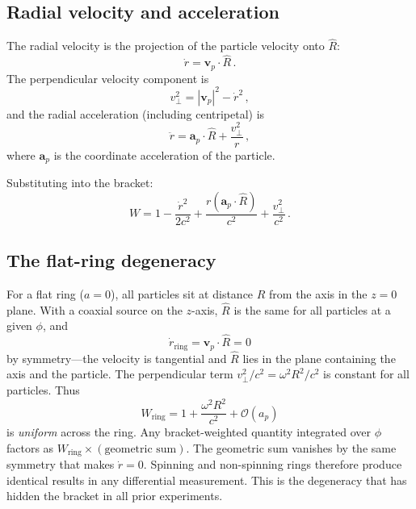 \documentclass[12pt,preprint,amsmath,amssymb]{revtex4-2}
\begin{document}
\subsection{Radial velocity and acceleration}

The radial velocity is the projection of the particle velocity onto $\hat{R}$:
\begin{equation}
\label{eq:rdot}
\dot{r} = \mathbf{v}_p \cdot \hat{R}\,.
\end{equation}
The perpendicular velocity component is
\begin{equation}
v_\perp^2 = |\mathbf{v}_p|^2 - \dot{r}^2\,,
\end{equation}
and the radial acceleration (including centripetal) is
\begin{equation}
\label{eq:rddot}
\ddot{r} = \mathbf{a}_p \cdot \hat{R} + \frac{v_\perp^2}{r}\,,
\end{equation}
where $\mathbf{a}_p$ is the coordinate acceleration of the particle.

Substituting into the bracket:
\begin{equation}
\label{eq:bracket_expanded}
W = 1 - \frac{\dot{r}^2}{2c^2} + \frac{r(\mathbf{a}_p \cdot \hat{R})}{c^2}
  + \frac{v_\perp^2}{c^2}\,.
\end{equation}

\subsection{The flat-ring degeneracy}

For a flat ring ($a = 0$), all particles sit at distance $R$ from the axis in the
$z = 0$ plane. With a coaxial source on the $z$-axis, $\hat{R}$ is the same for
all particles at a given $\phi$, and
\begin{equation}
\dot{r}_{\text{ring}} = \mathbf{v}_p \cdot \hat{R} = 0
\end{equation}
by symmetry---the velocity is tangential and $\hat{R}$ lies in the plane containing
the axis and the particle. The perpendicular term $v_\perp^2/c^2 = \omega^2 R^2/c^2$
is constant for all particles. Thus
\begin{equation}
W_{\text{ring}} = 1 + \frac{\omega^2 R^2}{c^2} + \mathcal{O}(a_p)
\end{equation}
is \emph{uniform} across the ring. Any bracket-weighted quantity integrated over
$\phi$ factors as $W_{\text{ring}} \times (\text{geometric sum})$. The geometric
sum vanishes by the same symmetry that makes $\dot{r} = 0$.
Spinning and non-spinning rings therefore produce identical results in any
differential measurement. This is the degeneracy that has hidden the bracket
in all prior experiments.
\end{document}
